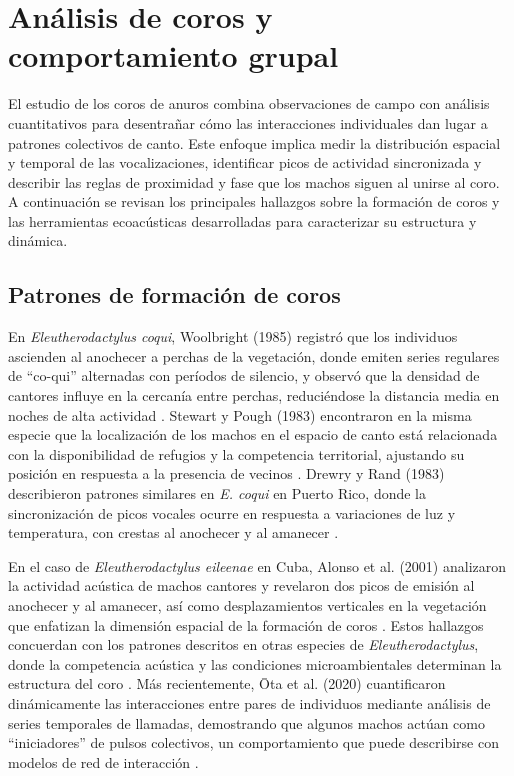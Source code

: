\section{Análisis de coros y comportamiento grupal}
\label{sec:analisis_coros}

El estudio de los coros de anuros combina observaciones de 
campo con análisis cuantitativos para desentrañar cómo las 
interacciones individuales dan lugar a patrones colectivos de 
canto. Este enfoque implica medir la distribución espacial y 
temporal de las vocalizaciones, identificar picos de actividad 
sincronizada y describir las reglas de proximidad y fase que 
los machos siguen al unirse al coro. A continuación se revisan 
los principales hallazgos sobre la formación de coros y las 
herramientas ecoacústicas desarrolladas para caracterizar su 
estructura y dinámica.


\subsection{Patrones de formación de coros} 
En \emph{Eleutherodactylus coqui}, Woolbright (1985) registró 
que los individuos ascienden al anochecer a perchas de la 
vegetación, donde emiten series regulares de “co-qui” 
alternadas con períodos de silencio, y observó que la 
densidad de cantores influye en la cercanía entre perchas, 
reduciéndose la distancia media en noches de alta actividad 
\cite{woolbright1985patterns}. Stewart y Pough (1983) encontraron en 
la misma especie que la localización de los machos en el 
espacio de canto está relacionada con la disponibilidad de 
refugios y la competencia territorial, ajustando su posición 
en respuesta a la presencia de vecinos \cite{stewart1983population}. 
Drewry y Rand (1983) describieron patrones similares en 
\emph{E. coqui} en Puerto Rico, donde la sincronización de 
picos vocales ocurre en respuesta a variaciones de luz y 
temperatura, con crestas al anochecer y al amanecer 
\cite{drewry1983characteristics}.  

En el caso de \emph{Eleutherodactylus eileenae} en Cuba, 
Alonso et al. (2001) analizaron la actividad acústica de 
machos cantores y revelaron dos picos de emisión al anochecer 
y al amanecer, así como desplazamientos verticales en la 
vegetación que enfatizan la dimensión espacial de la formación 
de coros \cite{alonso2001patrones}. Estos hallazgos concuerdan con 
los patrones descritos en otras especies de \emph{Eleutherodactylus}, 
donde la competencia acústica y las condiciones 
microambientales determinan la estructura del coro 
\cite{townsend1994reproductive}. Más recientemente, Ōta et al. (2020) 
cuantificaron dinámicamente las interacciones entre pares de 
individuos mediante análisis de series temporales de llamadas, 
demostrando que algunos machos actúan como “iniciadores” de 
pulsos colectivos, un comportamiento que puede describirse 
con modelos de red de interacción \cite{ota2020interaction}.  

